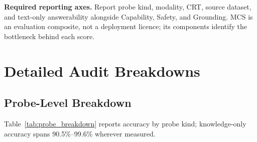 \documentclass{article}
\begin{document}
\textbf{Required reporting axes.} Report probe kind, modality, CRT, source dataset, and text-only answerability alongside Capability, Safety, and Grounding. MCS is an evaluation composite, not a deployment licence; its components identify the bottleneck behind each score.

\section{Detailed Audit Breakdowns}
\label{app:audit_breakdowns}


\subsection{Probe-Level Breakdown}

Table~\ref{tab:probe_breakdown} reports accuracy by probe kind; knowledge-only accuracy spans 90.5\%--99.6\% wherever measured.
\end{document}
